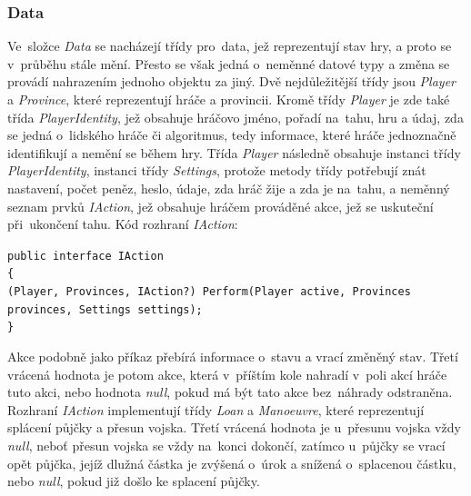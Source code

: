 \documentclass[a4paper,12pt]{article}
\def\keyword #1{\color{keyword}#1\color{black}}
\begin{document}
\subsubsection{Data}
Ve~složce \textit{Data} se nacházejí třídy pro~data, jež reprezentují stav hry, a proto se v~průběhu stále mění. Přesto se však jedná o~neměnné datové typy a změna se provádí nahrazením jednoho objektu za jiný. Dvě nejdůležitější třídy jsou \textit{Player} a \textit{Province}, které reprezentují hráče a provincii. Kromě třídy \textit{Player} je zde také třída \textit{PlayerIdentity}, jež obsahuje hráčovo jméno, pořadí na~tahu, hru a údaj, zda se jedná o~lidského hráče či algoritmus, tedy informace, které hráče jednoznačně identifikují a nemění se během hry. Třída \textit{Player} následně obsahuje instanci třídy \textit{PlayerIdentity}, instanci třídy \textit{Settings}, protože metody třídy potřebují znát nastavení, počet peněz, heslo, údaje, zda hráč žije a zda je na~tahu, a neměnný seznam prvků \textit{IAction}, jež obsahuje hráčem prováděné akce, jež se uskuteční při~ukončení tahu. Kód rozhraní \textit{IAction}:

\scriptsize\selectfont
\texttt{\keyword{public interface }IAction}\\
\texttt{\{}\\
\hspace*{8mm}\texttt{(Player, Provinces, IAction?) Perform(Player active, Provinces provinces, Settings settings);}\\
\texttt{\}}\normalsize

Akce podobně jako příkaz přebírá informace o~stavu a vrací změněný stav. Třetí vrácená hodnota je potom akce, která v~příštím kole nahradí v~poli akcí hráče tuto akci, nebo hodnota \textit{null}, pokud má být tato akce bez~náhrady odstraněna. Rozhraní \textit{IAction} implementují třídy \textit{Loan} a \textit{Manoeuvre}, které reprezentují splácení půjčky a přesun vojska. Třetí vrácená hodnota je u~přesunu vojska vždy \textit{null}, neboť přesun vojska se vždy na~konci dokončí, zatímco u~půjčky se vrací opět půjčka, jejíž dlužná částka je zvýšená o~úrok a snížená o~splacenou částku, nebo \textit{null}, pokud již došlo ke splacení půjčky.
\end{document}
